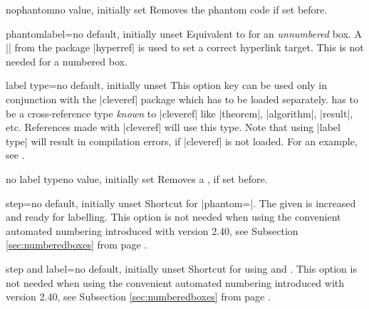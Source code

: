 \begin{docTcbKey}{nophantom}{}{no value, initially set}
Removes the phantom code if set before.
\end{docTcbKey}


\begin{docTcbKey}[][doc new=2014-11-28]{phantomlabel}{=}{no default, initially unset}
Equivalent to  for an \emph{unnumbered} box.
A || from the package |hyperref| is used to set a correct
hyperlink target. This is not needed for a numbered box.
\end{docTcbKey}

\begin{docTcbKey}{label type}{=}{no default, initially unset}
This option key can be used only in conjunction with the |cleveref| package
\cite{cubitt:2013a} which has to be loaded separately.
 has to be a cross-reference type \emph{known} to |cleveref|
like |theorem|, |algorithm|, |result|, etc. References made with |cleveref|
will use this type. Note that using |label type| will result in compilation
errors, if |cleveref| is not loaded.
For an example, see .
\end{docTcbKey}

\begin{docTcbKey}{no label type}{}{no value, initially set}
Removes a , if set before.
\end{docTcbKey}

\begin{docTcbKey}{step}{=}{no default, initially unset}
Shortcut for |phantom={}|. The given  is
increased and ready for labelling. This option is not needed when
using the convenient automated numbering introduced with version 2.40,
see Subsection \ref{sec:numberedboxes}
from page \pageref{sec:numberedboxes}.
\end{docTcbKey}

\begin{docTcbKey}{step and label}{=}{no default, initially unset}
Shortcut for using  and . This option is not needed when
using the convenient automated numbering introduced with version 2.40,
see Subsection \ref{sec:numberedboxes}
from page \pageref{sec:numberedboxes}.
\end{docTcbKey}


